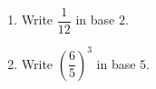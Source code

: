 \begin{enumerate}
\item[(a)] Write $\dfrac{1}{12}$ in base $2$.
\item[(b)] Write $\left(\dfrac{6}{5}\right)^3$ in base $5$.
\end{enumerate}
